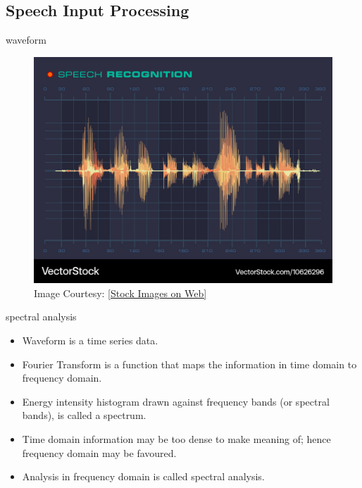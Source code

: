 \documentclass[aspectratio=169,xcolor={dvipsnames,svgnames}]{beamer}
\begin{document}
\subsection{Speech Input Processing}
\label{sec:org3e0894c}
\begin{frame}[label={sec:orga0f63f7}]{waveform}
\begin{figure}[htbp]
\centering
\includegraphics[width=0.6\linewidth]{org-download-images/introduction/2024-09-16_20-39-00_screenshot.png}
\caption{Image Courtesy: \href{https://cdn.vectorstock.com/i/1000v/62/96/speech-recognition-sound-wave-form-signal-diagram-vector-10626296.jpg}{[Stock Images on Web]​}}
\end{figure}
\end{frame}
\begin{frame}[label={sec:orgc2b43f6}]{spectral analysis}
\begin{itemize}
\item Waveform is a time series data.
\item Fourier Transform is a function that maps the
information in time domain to frequency domain.
\item Energy intensity histogram drawn against frequency
bands (or spectral bands), is called a spectrum.
\item Time domain information may be too dense to make
meaning of; hence frequency domain may be favoured.
\item Analysis in frequency domain is called spectral
analysis.
\end{itemize}
\end{frame}
\end{document}
